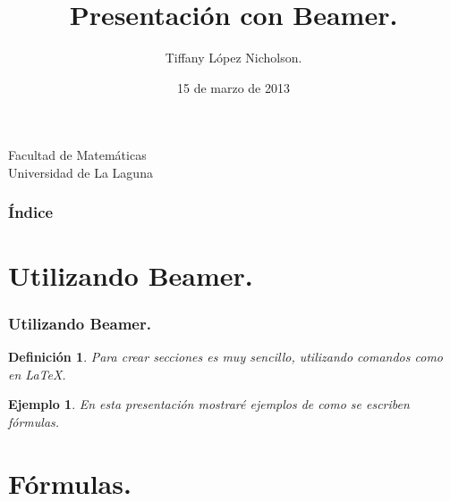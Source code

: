 \documentclass{beamer}
\title[Presentación con Beamer]{Presentación con Beamer.}
\author[Tiffany López Nicholson]{Tiffany López Nicholson.}
\date[15 de marzo de 2013]{15 de marzo de 2013}
\newtheorem{definicion}{Definición}
\newtheorem{ejemplo}{Ejemplo}
\begin{document}
\begin{frame}
  \titlepage

  \begin{scriptsize}
    \begin{center}
     Facultad de Matemáticas \\
     Universidad de La Laguna
    \end{center}
  \end{scriptsize}

\end{frame}

\begin{frame}
  \frametitle{Índice}  
  \tableofcontents[pausesections]
\end{frame}

\section{Utilizando Beamer.}

\begin{frame}

\frametitle{Utilizando Beamer.}

\begin{definicion}
  Para crear secciones es muy sencillo, utilizando comandos como en \LaTeX.
\end{definicion}

\begin{ejemplo}
  En esta presentación mostraré ejemplos de como se escriben fórmulas.
\end{ejemplo}

\end{frame}

\section{Fórmulas.}
\end{document}
